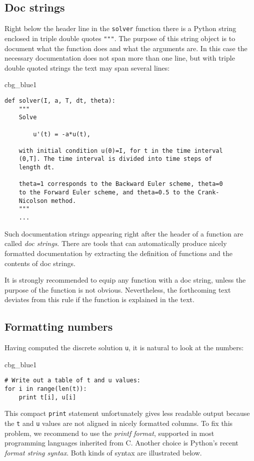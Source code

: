 \documentclass[graybox,sectrefs,envcountresetchap,open=right,final]{svmonodo}
\newenvironment{_cod_tight}[1]{
   \def\FrameCommand{\colorbox{#1}}
   \FrameRule0.6pt\MakeFramed {\FrameRestore}\vskip3mm}
   {\vskip0mm\endMakeFramed}
\newenvironment{cod}[1]{
\bgroup\rmfamily
\fboxsep=0mm\relax
\begin{_cod_tight}{#1}
\list{}{\parsep=-2mm\parskip=0mm\topsep=0pt\leftmargin=2mm
\rightmargin=2\leftmargin\leftmargin=4pt\relax}
\item\relax}
{\endlist\end{_cod_tight}\egroup}
\begin{document}
\subsection{Doc strings}


Right below the header line in the \texttt{solver} function there is a
Python string enclosed in triple double quotes \texttt{"""}.
The purpose of this string object is to document what the function
does and what the arguments are. In this case the necessary
documentation does not span more than one line, but with triple double
quoted strings the text may span several lines:

\begin{cod}{cbg_blue1}\begin{Verbatim}[numbers=none,fontsize=\fontsize{9pt}{9pt},baselinestretch=0.95,xleftmargin=2mm]
def solver(I, a, T, dt, theta):
    """
    Solve

        u'(t) = -a*u(t),

    with initial condition u(0)=I, for t in the time interval
    (0,T]. The time interval is divided into time steps of
    length dt.

    theta=1 corresponds to the Backward Euler scheme, theta=0
    to the Forward Euler scheme, and theta=0.5 to the Crank-
    Nicolson method.
    """
    ...
\end{Verbatim}
\end{cod}
\noindent
Such documentation strings appearing right after the header of
a function are called \emph{doc strings}. There are tools that can automatically
produce nicely formatted documentation by extracting the definition of
functions and the contents of doc strings.

It is strongly recommended to equip any function with a doc string,
unless the purpose of the function
is not obvious. Nevertheless, the forthcoming
text deviates from this rule if the function is explained in the text.


\subsection{Formatting numbers}

Having computed the discrete solution \texttt{u}, it is natural to look at
the numbers:
\begin{cod}{cbg_blue1}\begin{Verbatim}[numbers=none,fontsize=\fontsize{9pt}{9pt},baselinestretch=0.95,xleftmargin=2mm]
# Write out a table of t and u values:
for i in range(len(t)):
    print t[i], u[i]
\end{Verbatim}
\end{cod}
\noindent
This compact \texttt{print} statement unfortunately gives less readable output
because the \texttt{t} and \texttt{u} values are not aligned in nicely formatted columns.
To fix this problem, we recommend to use the \emph{printf format}, supported in most
programming languages inherited from C. Another choice is
Python's recent \emph{format string syntax}. Both kinds of syntax are illustrated
below.
\end{document}
